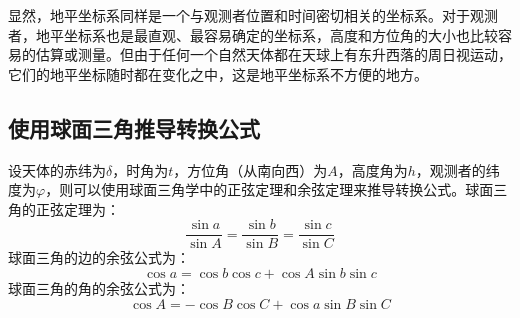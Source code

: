 \documentclass[a4paper]{article}
\begin{document}
显然，地平坐标系同样是一个与观测者位置和时间密切相关的坐标系。对于观测者，地平坐标系也是最直观、最容易确定的坐标系，高度和方位角的大小也比较容易的估算或测量。但由于任何一个自然天体都在天球上有东升西落的周日视运动，它们的地平坐标随时都在变化之中，这是地平坐标系不方便的地方。

\subsection{使用球面三角推导转换公式}

设天体的赤纬为$\delta$，时角为$t$，方位角（从南向西）为$A$，高度角为$h$，观测者的纬度为$\varphi$，则可以使用球面三角学中的正弦定理和余弦定理来推导转换公式。球面三角的正弦定理为：
\[
    \frac{\sin{a}}{\sin{A}} = \frac{\sin{b}}{\sin{B}} = \frac{\sin{c}}{\sin{C}}
\]
球面三角的边的余弦公式为：
\[
    \cos{a} = \cos{b}\cos{c} + \cos{A}\sin{b}\sin{c}
\]
球面三角的角的余弦公式为：
\[
    \cos{A} = -\cos{B}\cos{C} + \cos{a}\sin{B}\sin{C}
\]

\def\RotationX{90}
\def\RotationY{18}
\def\Latitude{60}
\pgfmathsetmacro{\EquatorTilt}{90-\Latitude}

\def\azimuth{60}
\def\altitude{60}
\def\declination{38.68218745}
\def\hourAngle{33.69006753}
\end{document}
